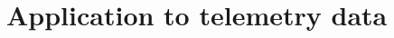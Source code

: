 \documentclass[preprint,12pt,authoryear]{elsarticle}
\def\E{\mathbb{E}}
\newtheorem{prop}{Proposition}
\newtheorem{thm}{Theorem}
\begin{document}




\section{Application to telemetry data}\label{Application}
\end{document}
